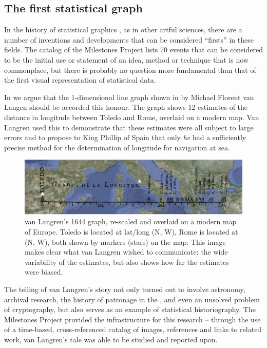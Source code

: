\subsection{The first statistical graph}
In the history of statistical graphics \citep{Friendly:06:hbook}, as in other 
artful sciences, there are a number of inventions and developments that can be 
considered ``firsts'' in these fields.
The catalog of the Milestones Project \citep{FriendlyDenis:01} lists 70 events 
that can be considered to be the initial use or statement of an idea, method or 
technique that is now commonplace, but there is probably no question more 
fundamental than that of the first visual representation of statistical data.

In \citet{Friendly-etal:2010:langren} we argue that the 1-dimensional line 
graph shown in  by Michael Florent van 
Langen \citep{Langren:1644} should be accorded this honour.
The graph shows 12 estimates of the distance in longitude between Toledo and 
Rome, overlaid on a modern map. 
Van Langren used this to demonstrate that these estimates were all subject to 
large errors and to
propose to King Phillip of Spain that only \emph{he} had a sufficiently precise method 
for the determination of longitude for navigation at sea.

\begin{figure}[htb]
 \centering
 \includegraphics[width=\textwidth]{fig/langren-google-overlay2}
 \caption{van Langren's 1644 graph, re-scaled and overlaid on a modern map of 
Europe. Toledo is located at lat/long %
(N, W), Rome is located at (N, 
W), both shown by markers (stars) on the map.  This image makes 
clear what van Langren wished to communicate: the wide variability of the 
estimates, but also shows how far the estimates were biased.}%
\label{fig:langren-google-overlay}
\end{figure}

The telling of van Langren's story not only turned out to involve astronomy, 
archival research, the history of patronage in the , and even an 
unsolved problem of cryptography, but also serves as an example of statistical 
historiography.
The Milestones Project provided the infrastructure for this research -- through 
the use of a time-based, cross-referenced catalog of images, references and 
links to related work, van Langren's tale was able to be studied and reported 
upon.

